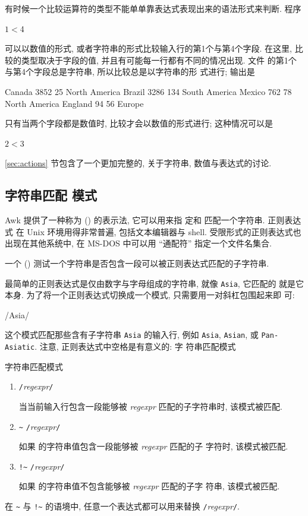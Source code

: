 有时候一个比较运算符的类型不能单单靠表达式表现出来的语法形式来判断. 程序
\begin{awkcode}
    $1 < $4
\end{awkcode}
可以以数值的形式, 或者字符串的形式比较输入行的第1个与第4个字段. 在这里,
比较的类型取决于字段的值, 并且有可能每一行都有不同的情况出现. 文件
 的第1个与第4个字段总是字符串, 所以比较总是以字符串的形
式进行; 输出是
\begin{awkcode}
    Canada      3852    25      North America
    Brazil      3286    134     South America
    Mexico      762     78      North America
    England     94      56      Europe
\end{awkcode}
只有当两个字段都是数值时, 比较才会以数值的形式进行; 这种情况可以是
\begin{awkcode}
    $2 < $3
\end{awkcode}

\ref{sec:actions} 节包含了一个更加完整的, 关于字符串, 数值与表达式的讨论.

\subsection{字符串匹配 模式}
\label{subsec:string_matching_pattern}

Awk 提供了一种称为  (\regexpr) 的表示法, 它可以用来指
定和
匹配一个字符串.  正则表达式 在 Unix 环境用得非常普遍, 包括文本编辑器与
shell. 受限形式的正则表达式也出现在其他系统中, 在 MS-DOS 中可以用
``通配符'' 指定一个文件名集合.

一个  ()
测试一个字符串是否包含一段可以被正则表达式匹配的子字符串.

最简单的正则表达式是仅由数字与字母组成的字符串, 就像 \verb'Asia', 它匹配的
就是它本身. 为了将一个正则表达式切换成一个模式, 只需要用一对斜杠包围起来即
可:
\begin{awkcode}
    /Asia/
\end{awkcode}
这个模式匹配那些含有子字符串 \verb'Asia' 的输入行, 例如 \verb'Asia',
\verb'Asian', 或 \verb'Pan-Asiatic'. 注意, 正则表达式中空格是有意义的: 字
符串匹配模式
\begin{summary}{字符串匹配模式}
    \begin{enumerate}
        \item \verb'/'\textit{regexpr}\verb'/' \par
            当当前输入行包含一段能够被 \textit{regexpr} 匹配的子字符串时,
            该模式被匹配.
        \item \expr {} \verb'~' \verb'/'\textit{regexpr}\verb'/' \par
            如果 \expr 的字符串值包含一段能够被 \textit{regexpr} 匹配的子
            字符时, 该模式被匹配.
        \item \expr {} \verb'!~' \verb'/'\textit{regexpr}\verb'/' \par
            如果 \expr 的字符串值不包含能够被 \textit{regexpr} 匹配的子字
            符串, 该模式被匹配.
    \end{enumerate}
    在 \verb'~' 与 \verb'!~' 的语境中, 任意一个表达式都可以用来替换
    \verb'/'\textit{regexpr}\verb'/'.
\end{summary}

